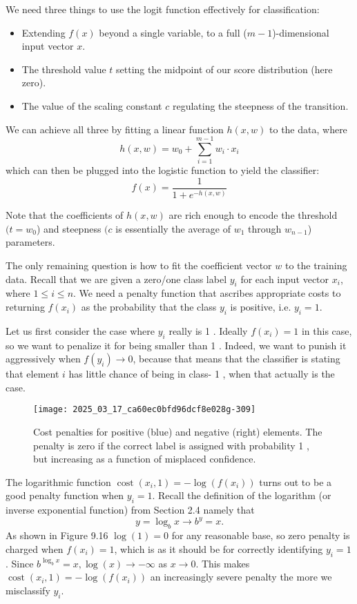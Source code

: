 \documentclass[10pt]{article}
\begin{document}
We need three things to use the logit function effectively for classification:

\begin{itemize}
  \item Extending \(f(x)\) beyond a single variable, to a full (\(m-1\))-dimensional input vector \(x\).
  \item The threshold value \(t\) setting the midpoint of our score distribution (here zero).
  \item The value of the scaling constant \(c\) regulating the steepness of the transition.
\end{itemize}

We can achieve all three by fitting a linear function \(h(x, w)\) to the data, where
\[
h(x, w)=w_{0}+\sum_{i=1}^{m-1} w_{i} \cdot x_{i}
\]
which can then be plugged into the logistic function to yield the classifier:
\[
f(x)=\frac{1}{1+e^{-h(x, w)}}
\]

Note that the coefficients of \(h(x, w)\) are rich enough to encode the threshold \((t=w_{0}\)) and steepness \((c\) is essentially the average of \(w_{1}\) through \(w_{n-1}\)) parameters.

The only remaining question is how to fit the coefficient vector \(w\) to the training data. Recall that we are given a zero/one class label \(y_{i}\) for each input vector \(x_{i}\), where \(1 \leq i \leq n\). We need a penalty function that ascribes appropriate costs to returning \(f(x_{i})\) as the probability that the class \(y_{i}\) is positive, i.e. \(y_{i}=1\).

Let us first consider the case where \(y_{i}\) really is 1 . Ideally \(f(x_{i})=1\) in this case, so we want to penalize it for being smaller than 1 . Indeed, we want to punish it aggressively when \(f(y_{i}) \rightarrow 0\), because that means that the classifier is stating that element \(i\) has little chance of being in class- 1 , when that actually is the case.

\begin{figure}[h]
    \centering
    \texttt{[image: 2025\_03\_17\_ca60ec0bfd96dcf8e028g-309]}
    \caption{Cost penalties for positive (blue) and negative (right) elements. The penalty is zero if the correct label is assigned with probability 1 , but increasing as a function of misplaced confidence.}
\end{figure}

The logarithmic function \(\operatorname{cost}(x_{i}, 1)=-\log (f(x_{i}))\) turns out to be a good penalty function when \(y_{i}=1\). Recall the definition of the logarithm (or inverse exponential function) from Section 2.4 namely that
\[
y=\log_{b} x \rightarrow b^{y}=x.
\]
As shown in Figure 9.16 \(\log (1)=0\) for any reasonable base, so zero penalty is charged when \(f(x_{i})=1\), which is as it should be for correctly identifying \(y_{i}=1\). Since \(b^{\log_{b} x}=x, \log (x) \rightarrow-\infty\) as \(x \rightarrow 0\). This makes \(\operatorname{cost}(x_{i}, 1)=-\log (f(x_{i}))\) an increasingly severe penalty the more we misclassify \(y_{i}\).
\end{document}
